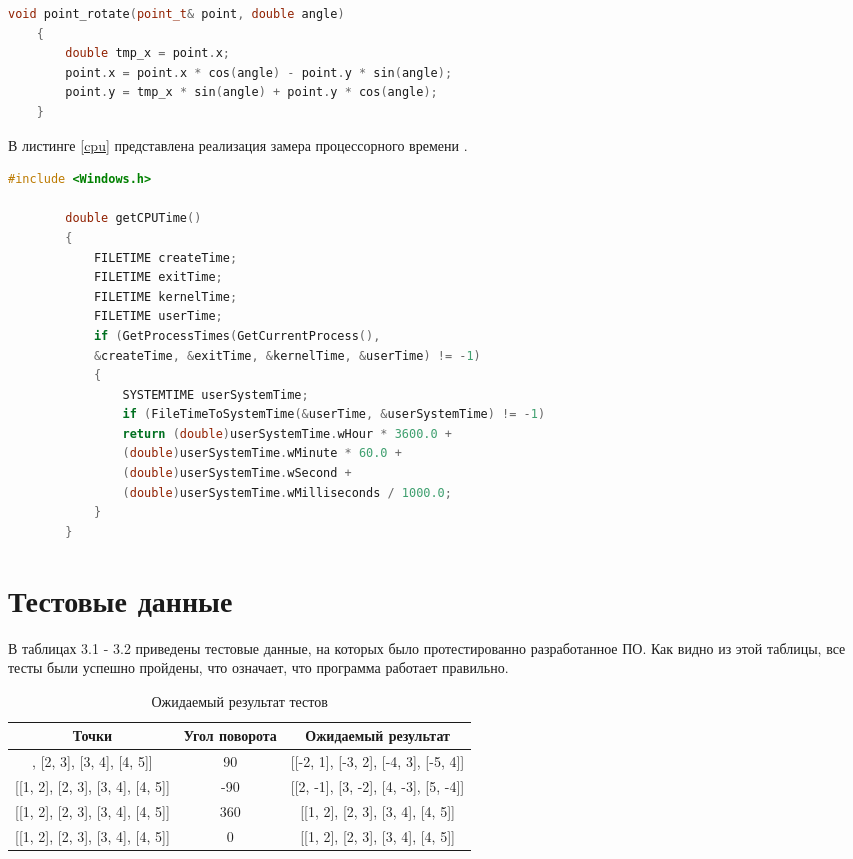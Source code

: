 \documentclass[12pt]{report}
\begin{document}
	\begin{lstlisting}[label=point,caption=Функция поворота точки,language=C++]
	void point_rotate(point_t& point, double angle)
	{
		double tmp_x = point.x;
		point.x = point.x * cos(angle) - point.y * sin(angle);
		point.y = tmp_x * sin(angle) + point.y * cos(angle);
	}
	\end{lstlisting}

	\newpage
	
	В листинге \ref{cpu} представлена реализация замера процессорного времени \cite{process}.
	
	\begin{lstlisting}[label=cpu,caption=Функция замера процессорного времени,language=C++]
		#include <Windows.h>
		
		double getCPUTime()
		{
			FILETIME createTime;
			FILETIME exitTime;
			FILETIME kernelTime;
			FILETIME userTime;
			if (GetProcessTimes(GetCurrentProcess(),
			&createTime, &exitTime, &kernelTime, &userTime) != -1)
			{
				SYSTEMTIME userSystemTime;
				if (FileTimeToSystemTime(&userTime, &userSystemTime) != -1)
				return (double)userSystemTime.wHour * 3600.0 +
				(double)userSystemTime.wMinute * 60.0 +
				(double)userSystemTime.wSecond +
				(double)userSystemTime.wMilliseconds / 1000.0;
			}
		}
	\end{lstlisting}
	
	\section{Тестовые данные}
	
	В таблицах 3.1 - 3.2 приведены тестовые данные, на которых было протестированно разработанное ПО. Как видно из этой таблицы, все тесты были успешно пройдены, что означает, что программа работает правильно.
	
	\begin{table}[h]
		\label{tabular:func}
		\caption{Ожидаемый результат тестов}
		\begin{center}
			\begin{tabular}{ | c | c | c |}
				\hline
				\textbf{Точки} & \textbf{Угол поворота} & \textbf{Ожидаемый результат} \\ \hline
				[[1, 2], [2, 3], [3, 4], [4, 5]] & 90 &
				[[-2, 1], [-3, 2], [-4, 3], [-5, 4]]\\
				\hline
				
				[[1, 2], [2, 3], [3, 4], [4, 5]] & -90 &
				[[2, -1], [3, -2], [4, -3], [5, -4]]\\
				\hline
				
				[[1, 2], [2, 3], [3, 4], [4, 5]] & 360 &
				[[1, 2], [2, 3], [3, 4], [4, 5]] \\
				\hline
				
				[[1, 2], [2, 3], [3, 4], [4, 5]] & 0 &
				[[1, 2], [2, 3], [3, 4], [4, 5]] \\
				\hline
			\end{tabular}
		\end{center}
	\end{table}
\end{document}
